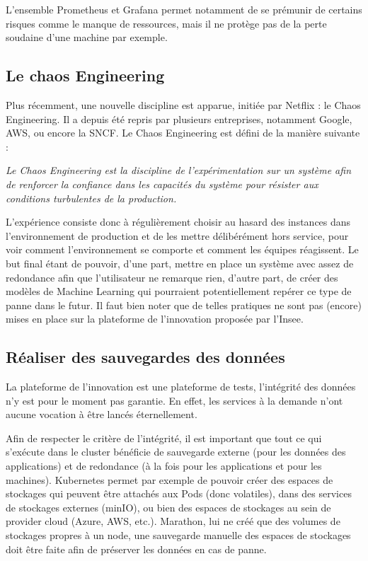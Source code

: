 \documentclass[11pt,fleqn]{book} %
\begin{document}
L'ensemble Prometheus et Grafana permet notamment de se prémunir de certains risques comme le manque de ressources, mais il ne protège pas de la perte soudaine d'une machine par exemple.\newline


\subsection*{Le chaos Engineering}
Plus récemment, une nouvelle discipline est apparue, initiée par Netflix : le Chaos Engineering. Il a depuis été repris par plusieurs entreprises, notamment Google, AWS, ou encore la SNCF. Le Chaos Engineering est défini de la manière suivante : \newline

\textit{ Le Chaos Engineering est la discipline de l'expérimentation sur un système
afin de renforcer la confiance dans les capacités du système
pour résister aux conditions turbulentes de la production. }\newline

L’expérience consiste donc à régulièrement choisir au hasard des instances dans l’environnement de production et de les mettre délibérément hors service, pour voir comment l'environnement se comporte et comment les équipes réagissent. Le but final étant de pouvoir, d'une part, mettre en place un système avec assez de redondance afin que l'utilisateur ne remarque rien, d'autre part, de créer des modèles de Machine Learning qui pourraient potentiellement repérer ce type de panne dans le futur. Il faut bien noter que de telles pratiques ne sont pas (encore) mises en place sur la plateforme de l'innovation proposée par l'Insee.


\subsection*{Réaliser des sauvegardes des données}
La plateforme de l'innovation est une plateforme de tests, l'intégrité des données n'y est pour le moment pas garantie. En effet, les services à la demande n'ont aucune vocation à être lancés éternellement.\newline

Afin de respecter le critère de l'intégrité, il est important que tout ce qui s'exécute dans le cluster bénéficie de sauvegarde externe (pour les données des applications) et de redondance (à la fois pour les applications et pour les machines). Kubernetes permet par exemple de pouvoir créer des espaces de stockages qui peuvent être attachés aux Pods (donc volatiles), dans des services de stockages externes (minIO), ou bien des espaces de stockages au sein de provider cloud (Azure, AWS, etc.). Marathon, lui ne créé que des volumes de stockages propres à un node, une sauvegarde manuelle des espaces de stockages doit être faite afin de préserver les données en cas de panne. 
\end{document}
